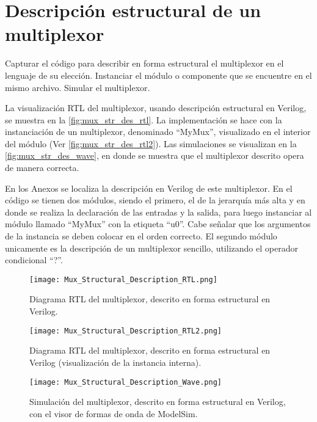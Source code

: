\section{Descripción estructural de un multiplexor \label{sec:s1}}

\begin{center}
	\begin{minipage}{12cm}
		\begin{tcolorbox}[title=Actividad 1]
			Capturar el código para describir en forma estructural el multiplexor en el lenguaje de su elección. Instanciar el módulo o componente que se encuentre en el mismo archivo. Simular el multiplexor.
		\end{tcolorbox}	
	\end{minipage}
\end{center}

La visualización RTL del multiplexor, usando descripción estructural en Verilog, se muestra en la \autoref{fig:mux_str_des_rtl}. La implementación se hace con la instanciación de un multiplexor, denominado ``MyMux'', visualizado en el interior del módulo (Ver \autoref{fig:mux_str_des_rtl2}). Las simulaciones se visualizan en la \autoref{fig:mux_str_des_wave}, en donde se muestra que el multiplexor descrito opera de manera correcta.

En los Anexos se localiza la descripción en Verilog de este multiplexor. En el código se tienen dos módulos, siendo el primero, el de la jerarquía más alta y en donde se realiza la declaración de las entradas y la salida, para luego instanciar al módulo llamado ``MyMux'' con la etiqueta ``u0''. Cabe señalar que los argumentos de la instancia se deben colocar en el orden correcto. El segundo módulo unicamente es la descripción de un multiplexor sencillo, utilizando el operador condicional ``?''.

\begin{figure}[ht]
	\centering
	\texttt{[image: Mux\_Structural\_Description\_RTL.png]}
	\caption{Diagrama RTL del multiplexor, descrito en forma estructural en Verilog. \label{fig:mux_str_des_rtl}}
\end{figure}

\begin{figure}[ht]
	\centering
	\texttt{[image: Mux\_Structural\_Description\_RTL2.png]}
	\caption{Diagrama RTL del multiplexor, descrito en forma estructural en Verilog (visualización de la instancia interna). \label{fig:mux_str_des_rtl2}}
\end{figure}

\begin{figure}[ht]
	\centering
	\texttt{[image: Mux\_Structural\_Description\_Wave.png]}
	\caption{Simulación del multiplexor, descrito en forma estructural en Verilog, con el visor de formas de onda de ModelSim. \label{fig:mux_str_des_wave}}
\end{figure}